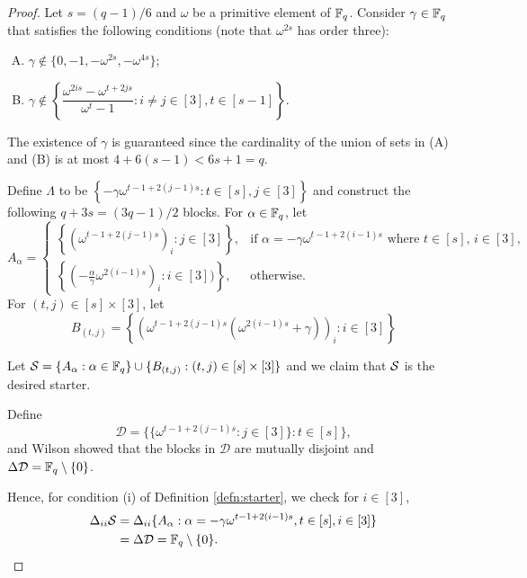 \documentclass[draft, 11pt]{article}
\begin{document}
 \begin{proof}
 Let $s=(q-1)/6$ and $\omega$ be a primitive element of $\mathbb F_q$.
 Consider $\gamma\in\mathbb F_q$ that satisfies the following conditions (note that $\omega^{2s}$ has order three):
 \begin{enumerate}[(A)]
 \item $\gamma\notin \{0,-1,-\omega^{2s},-\omega^{4s}\}$;
 \item $\gamma\notin \left\{\dfrac{\omega^{2is}-\omega^{t+2js}}{\omega^t-1}: i\ne j\in [3], t\in [s-1] \right\}$.
 \end{enumerate}
 The existence of $\gamma$ is guaranteed since the cardinality of the
 union of sets in (A) and (B) is at most $4+ 6(s-1)<6s+1=q$.




 Define $\Lambda$ to be $\left\{-\gamma \omega^{t-1+2(j-1)s} : t\in [s], j\in [3]\right\}$ and
construct the following $q+3s=(3q-1)/2$ blocks.
 For $\alpha\in \mathbb F_q$, let
 {
 \begin{equation*}
 A_{\alpha}  =
 \begin{cases}
 \left\{\left(\omega^{t-1+2(j-1)s}\right)_i: j\in [3]\right\},           & \mbox{if $\alpha=-\gamma\omega^{t-1+2(i-1)s}$} %
 \mbox{ where $t\in [s]$, $i\in [3]$,}\\
 \left\{\left(-\frac{\alpha}{\gamma} \omega^{2(i-1)s}\right)_i:i\in
 [3])\right\},    & \mbox{otherwise.}
 \end{cases}
 \end{equation*}
 } For $(t,j)\in [s]\times [3]$, let
 \begin{equation*}
 B_{(t,j)}  =
 \left\{\left(\omega^{t-1+2(j-1)s}\left(\omega^{2(i-1)s}+\gamma\right)\right)_i:
 i \in [3]\right\}
 \end{equation*}

 Let $\mathcal S=\{A_\alpha: \alpha\in \mathbb F_q\}\cup \{B_{(t,j)}: (t,j)\in [s]\times [3]\}$ and
 we claim that $\mathcal S$ is the desired starter.%

Define
\begin{equation*}
\mathcal D=\{\{\omega^{t-1+2(j-1)s}: j\in [3]\}: t\in [s]\},
\end{equation*} 
\noindent and Wilson \cite{Wilson:1972d} showed that the blocks in $\mathcal D$ are mutually disjoint and
$\Delta \mathcal D=\mathbb F_q\setminus\{0\}$.


Hence, for condition (i) of Definition \ref{defn:starter}, we check
for $i\in [3]$,
\begin{align*}
\Delta_{ii} \mathcal S
&= \Delta_{ii} \{A_\alpha: \alpha= -\gamma \omega^{t-1+2(i-1)s}, t\in[s], i \in [3]\} \\
&= \Delta \mathcal D = \mathbb F_q\setminus\{0\}.
\end{align*}


\end{proof}
\end{document}
